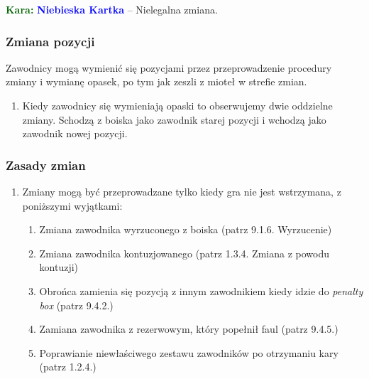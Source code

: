 \documentclass[11pt,a4paper]{article}
\newcommand\bluecard[1]{\bgroup\textcolor{darkgreen}{\textbf{Kara: }}\bgroup\textcolor{blue}{\textbf{Niebieska Kartka}} -- #1}
\begin{document}
\bluecard{Nielegalna zmiana.}

\subsubsection{Zmiana pozycji}
Zawodnicy mogą wymienić się pozycjami przez przeprowadzenie procedury zmiany i wymianę opasek, po tym jak zeszli z mioteł w strefie zmian.
\begin{enumerate}
  \item Kiedy zawodnicy się wymieniają opaski to obserwujemy dwie oddzielne zmiany. Schodzą z boiska jako zawodnik starej pozycji i wchodzą jako zawodnik nowej pozycji.
\end{enumerate}

\subsubsection{Zasady zmian}
\begin{enumerate}
  \item Zmiany mogą być przeprowadzane tylko kiedy gra nie jest wstrzymana, z poniższymi wyjątkami:
  \begin{enumerate}
    \item Zmiana zawodnika wyrzuconego z boiska (patrz 9.1.6. Wyrzucenie) %
    \item Zmiana zawodnika kontuzjowanego (patrz 1.3.4. Zmiana z powodu kontuzji) %
    \item Obrońca zamienia się pozycją z innym zawodnikiem kiedy idzie do \emph{penalty box} (patrz 9.4.2.) %
    \item Zamiana zawodnika z rezerwowym, który popełnił faul (patrz 9.4.5.) %
    \item Poprawianie niewłaściwego zestawu zawodników po otrzymaniu kary (patrz 1.2.4.) %
  \end{enumerate}
\end{enumerate}
\end{document}
